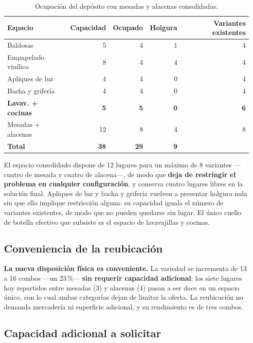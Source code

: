 \documentclass[10pt,a4paper]{article}
\newcommand{\cuello}[1]{\textbf{\textcolor{limita}{#1}}}
\begin{document}
\begin{table}[H]
\centering\small
\caption{Ocupación del depósito con mesadas y alacenas consolidadas.}
\label{tab:ocupacion_e3}
\begin{tabular}{lrrrr}
\toprule
\textbf{Espacio} & \textbf{Capacidad} & \textbf{Ocupado} & \textbf{Holgura} & \textbf{Variantes existentes} \\
\midrule
Baldosas                  & 5 & 4 & 1 & 4 \\
Empapelado vinílico       & 8 & 4 & 4 & 4 \\
Apliques de luz           & 4 & 4 & 0 & 4 \\
Bacha y grifería          & 4 & 4 & 0 & 4 \\
\cuello{Lavav. + cocinas} & \cuello{5} & \cuello{5} & \cuello{0} & \cuello{6} \\
Mesadas + alacenas        & 12 & 8 & 4 & 8 \\
\midrule
\textbf{Total} & \textbf{38} & \textbf{29} & \textbf{9} & \\
\bottomrule
\end{tabular}
\end{table}

El espacio consolidado dispone de 12 lugares para un máximo de 8 variantes
—cuatro de mesada y cuatro de alacena—, de modo que \textbf{deja de restringir
el problema en cualquier configuración}, y conserva cuatro lugares libres en la
solución final. Apliques de luz y bacha y grifería vuelven a presentar holgura
nula sin que ello implique restricción alguna: su capacidad iguala el número de
variantes existentes, de modo que no pueden quedarse sin lugar. El único cuello
de botella efectivo que subsiste es el espacio de lavavajillas y cocinas.

\subsection{Conveniencia de la reubicación}

\textbf{La nueva disposición física es conveniente.} La variedad se incrementa
de 13 a 16 combos —un 23\,\%— \textbf{sin requerir capacidad adicional}: los
siete lugares hoy repartidos entre mesadas (3) y alacenas (4) pasan a ser doce
en un espacio único, con lo cual ambas categorías dejan de limitar la oferta. La
reubicación no demanda mercadería ni superficie adicional, y su rendimiento es
de tres combos.

\subsection{Capacidad adicional a solicitar}
\end{document}
